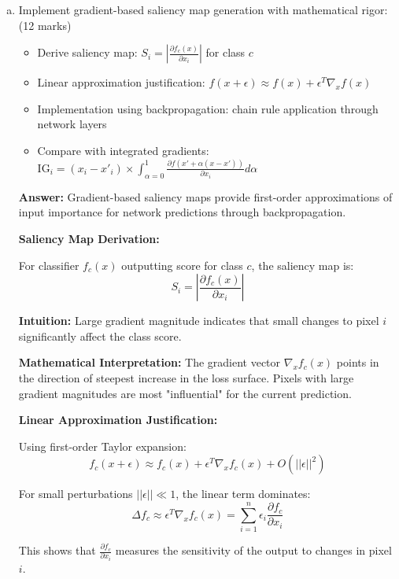 \documentclass[12pt]{article}
\newcommand{\answer}[1]{{\color{answercolor}\textbf{Answer:} #1}}
\newcommand{\explanation}[1]{{\color{explanationcolor}#1}}
\begin{document}
\begin{enumerate}[(a)]
    \item Implement gradient-based saliency map generation with mathematical rigor: \hfill (12 marks)
    \begin{itemize}
        \item Derive saliency map: $S_i = \left|\frac{\partial f_c(x)}{\partial x_i}\right|$ for class $c$
        \item Linear approximation justification: $f(x + \epsilon) \approx f(x) + \epsilon^T \nabla_x f(x)$
        \item Implementation using backpropagation: chain rule application through network layers
        \item Compare with integrated gradients: $\text{IG}_i = (x_i - x'_i) \times \int_{\alpha=0}^1 \frac{\partial f(x' + \alpha(x-x'))}{\partial x_i} d\alpha$
    \end{itemize}
    
    \answer{Gradient-based saliency maps provide first-order approximations of input importance for network predictions through backpropagation.}
    
    \explanation{
    \textbf{Saliency Map Derivation:}
    
    For classifier $f_c(x)$ outputting score for class $c$, the saliency map is:
    $$S_i = \left|\frac{\partial f_c(x)}{\partial x_i}\right|$$
    
    \textbf{Intuition:} Large gradient magnitude indicates that small changes to pixel $i$ significantly affect the class score.
    
    \textbf{Mathematical Interpretation:}
    The gradient vector $\nabla_x f_c(x)$ points in the direction of steepest increase in the loss surface. Pixels with large gradient magnitudes are most "influential" for the current prediction.
    
    \textbf{Linear Approximation Justification:}
    
    Using first-order Taylor expansion:
    $$f_c(x + \epsilon) \approx f_c(x) + \epsilon^T \nabla_x f_c(x) + O(||\epsilon||^2)$$
    
    For small perturbations $||\epsilon|| \ll 1$, the linear term dominates:
    $$\Delta f_c \approx \epsilon^T \nabla_x f_c(x) = \sum_{i=1}^n \epsilon_i \frac{\partial f_c}{\partial x_i}$$
    
    This shows that $\frac{\partial f_c}{\partial x_i}$ measures the sensitivity of the output to changes in pixel $i$.
    
}
\end{enumerate}
\end{document}
